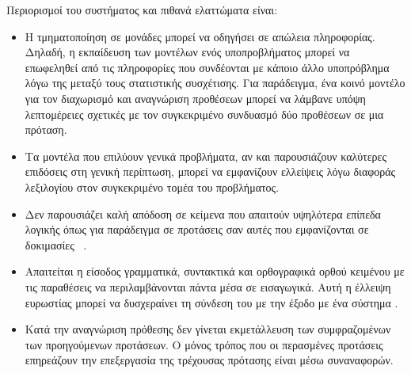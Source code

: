 Περιορισμοί του συστήματος και πιθανά ελαττώματα είναι:
\begin{itemize}
    \item Η τμηματοποίηση σε μονάδες μπορεί να οδηγήσει σε απώλεια πληροφορίας.
          Δηλαδή, η εκπαίδευση των μοντέλων ενός υποπροβλήματος μπορεί να επωφεληθεί από τις πληροφορίες που συνδέονται με κάποιο άλλο υποπρόβλημα λόγω της μεταξύ τους στατιστικής συσχέτισης.
          Για παράδειγμα, ένα κοινό μοντέλο για τον διαχωρισμό και αναγνώριση προθέσεων μπορεί να λάμβανε υπόψη λεπτομέρειες σχετικές με τον συγκεκριμένο συνδυασμό δύο προθέσεων σε μια πρόταση.
    \item Τα μοντέλα που επιλύουν γενικά προβλήματα, αν και παρουσιάζουν καλύτερες επιδόσεις στη γενική περίπτωση, μπορεί να εμφανίζουν ελλείψεις λόγω διαφοράς λεξιλογίου στον συγκεκριμένο τομέα του προβλήματος.
    \item Δεν παρουσιάζει καλή απόδοση σε κείμενα που απαιτούν υψηλότερα επίπεδα λογικής όπως για παράδειγμα σε προτάσεις σαν αυτές που εμφανίζονται σε δοκιμασίες ~\cite{levesque2012winograd}.
    \item Απαιτείται η είσοδος γραμματικά, συντακτικά και ορθογραφικά ορθού κειμένου με τις παραθέσεις να περιλαμβάνονται πάντα μέσα σε εισαγωγικά.
          Αυτή η έλλειψη ευρωστίας μπορεί να δυσχεραίνει τη σύνδεση του \projectname{} με την έξοδο με ένα σύστημα .
    \item Κατά την αναγνώριση πρόθεσης δεν γίνεται εκμετάλλευση των συμφραζομένων των προηγούμενων προτάσεων.
          Ο μόνος τρόπος που οι περασμένες προτάσεις επηρεάζουν την επεξεργασία της τρέχουσας πρότασης είναι μέσω συναναφορών.
\end{itemize}

